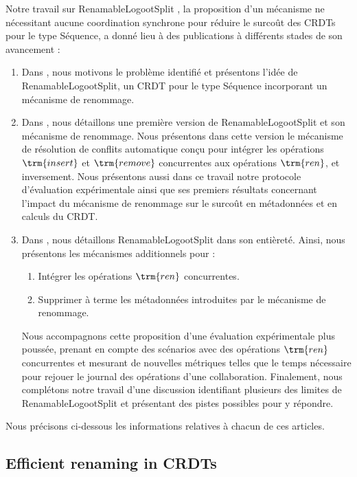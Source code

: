 
Notre travail sur RenamableLogootSplit , \ie la proposition d'un mécanisme ne nécessitant aucune coordination synchrone pour réduire le surcoût des \acp{CRDT} pour le type Séquence, a donné lieu à des publications à différents stades de son avancement :
\begin{enumerate}
    \item Dans \cite{2018-rls-middleware-nicolas}, nous motivons le problème identifié et présentons l'idée de RenamableLogootSplit, un \ac{CRDT} pour le type Séquence incorporant un mécanisme de renommage.
    \item Dans \cite{2020-rls-papoc-nicolas}, nous détaillons une première version de RenamableLogootSplit et son mécanisme de renommage.
        Nous présentons dans cette version le mécanisme de résolution de conflits automatique conçu pour intégrer les opérations $\trm{insert}$ et $\trm{remove}$ concurrentes aux opérations $\trm{ren}$, et inversement.
        Nous présentons aussi dans ce travail notre protocole d'évaluation expérimentale ainsi que ses premiers résultats concernant l'impact du mécanisme de renommage sur le surcoût en métadonnées et en calculs du \ac{CRDT}.
    \item Dans \cite{2022-rls-tpds-nicolas}, nous détaillons RenamableLogootSplit dans son entièreté.
        Ainsi, nous présentons les mécanismes additionnels pour :
        \begin{enumerate}
            \item Intégrer les opérations $\trm{ren}$ concurrentes.
            \item Supprimer à terme les métadonnées introduites par le mécanisme de renommage.
        \end{enumerate}
        Nous accompagnons cette proposition d'une évaluation expérimentale plus poussée, prenant en compte des scénarios avec des opérations $\trm{ren}$ concurrentes et mesurant de nouvelles métriques telles que le temps nécessaire pour rejouer le journal des opérations d'une collaboration.
        Finalement, nous complétons notre travail d'une discussion identifiant plusieurs des limites de RenamableLogootSplit et présentant des pistes possibles pour y répondre.
\end{enumerate}
Nous précisons ci-dessous les informations relatives à chacun de ces articles.

\subsection*{Efficient renaming in CRDTs \cite{2018-rls-middleware-nicolas}}

